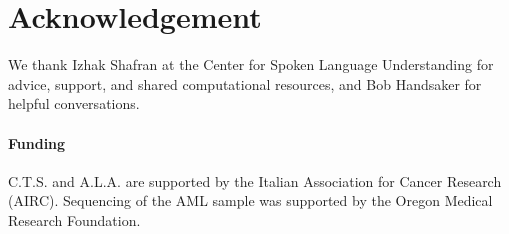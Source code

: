 \documentclass{bioinfo}
\begin{document}














\section*{Acknowledgement}
We thank Izhak Shafran at the Center for Spoken Language Understanding for advice, support, and shared computational resources, and Bob Handsaker for helpful conversations.

\paragraph{Funding\textcolon} C.T.S. and A.L.A. are supported by the Italian Association for Cancer Research (AIRC). Sequencing of the AML sample was supported by the Oregon Medical Research Foundation. 
\end{document}
